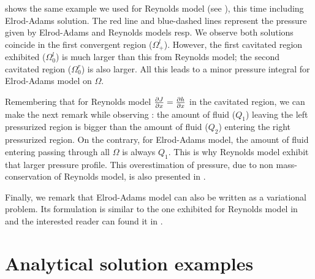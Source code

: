  shows the same example we used for Reynolds model (see ), this time including Elrod-Adams solution. The red line and blue-dashed lines represent the pressure given by Elrod-Adams and Reynolds models resp. We observe both solutions coincide in the first convergent region ($\Omega_+^l$). However, the first cavitated region exhibited ($\Omega_0^l$) is much larger than this from Reynolds model; the second cavitated region ($\Omega_0^r$) is also larger. All this leads to a minor pressure integral for Elrod-Adams model on $\Omega$.

Remembering that for Reynolds model $\frac{\partial J}{\partial x}=\frac{\partial h}{\partial x}$ in the cavitated region, we can make the next remark while observing : the amount of fluid ($Q_1$) leaving the left  pressurized region is bigger than the amount of fluid ($Q_2$) entering the right pressurized region. On the contrary, for Elrod-Adams model, the amount of fluid entering passing through all $\Omega$ is always $Q_1$. This is why Reynolds model exhibit that larger pressure profile. This overestimation of pressure, due to non mass-conservation of Reynolds model, is also presented in \cite{ausas07,qiu2009}.

Finally, we remark that Elrod-Adams model can also be written as a variational problem. Its formulation is similar to the one exhibited for Reynolds model in  and the interested reader can found it in \cite{bayada1982}.
\section{Analytical solution examples}\label{sec:ex_analytic_sol}
